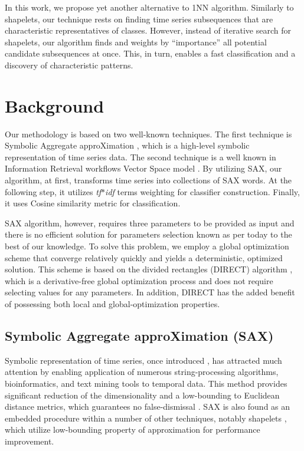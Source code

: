 \documentclass{llncs}
\begin{document}
In this work, we propose yet another alternative to 1NN algorithm. Similarly to shapelets, our
technique rests on finding time series subsequences that are characteristic representatives of
classes. However, instead of iterative search for shapelets, our algorithm finds and weights by
``importance'' all potential candidate subsequences at once. This, in turn, enables a fast
classification and a discovery of characteristic patterns.

\section{Background}
Our methodology is based on two well-known techniques. The first technique is Symbolic Aggregate
approXimation \cite{sax}, which is a high-level symbolic representation of time series
data. The second technique is a well known in Information Retrieval workflows Vector Space 
model \cite{salton}. By utilizing SAX, our algorithm, at first, transforms time series into
collections of 
SAX words. At the following step, it utilizes \textit{tf$\ast$idf} terms weighting for classifier 
construction. Finally, it uses Cosine similarity metric for classification.

SAX algorithm, however, requires three parameters to be provided as input and there is no
efficient solution for parameters selection known as per today to the best of our knowledge. 
To solve this problem, we employ a global 
optimization scheme that converge relatively quickly and yields a deterministic, optimized
solution. 
This scheme is based on the divided rectangles (DIRECT) algorithm \cite{direct}, which is
a derivative-free global optimization process and does not require selecting values for any
parameters.
In addition, DIRECT has the added benefit of possessing both local and global-optimization
properties. 

\subsection{Symbolic Aggregate approXimation (SAX)}
Symbolic representation of time series, once introduced \cite{sax}, has attracted much attention by
enabling application of numerous string-processing algorithms, bioinformatics, and text mining 
tools to temporal data. This method provides significant reduction of the dimensionality and
a low-bounding to Euclidean distance metrics, which guarantees no false-dismissal \cite{hot_sax}.
SAX is also found as an embedded procedure within a number of other techniques, notably 
shapelets \cite{fast-shapelets}, which utilize low-bounding property of approximation for 
performance improvement.
\end{document}
